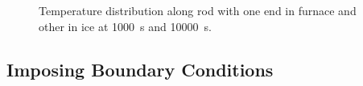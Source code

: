 \begin{figure}
    \ContinuedFloat
    \centering
    \caption{Temperature distribution along rod with one end in furnace and other in ice at \SI{1000}{\second} and \SI{10000}{\second}.}
    \label{fig:cold_diffusion}
\end{figure}

\subsection{Imposing Boundary Conditions}
\label{subsec:imposing_boundary_conditions}

